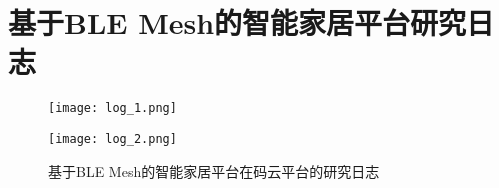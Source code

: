 \chapter{基于BLE Mesh的智能家居平台研究日志}

\begin{figure}[H]
  \centering
  \texttt{[image: log\_1.png]}
  \caption*{}
  \label{fig:log_1}
\end{figure}

\begin{figure}[H]
  \centering
  \texttt{[image: log\_2.png]}
  \caption{基于BLE Mesh的智能家居平台在码云平台的研究日志}
  \label{fig:log_2}
\end{figure}